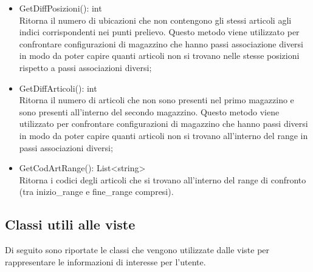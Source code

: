 \begin{itemize}
    \item GetDiffPosizioni(): int \\
    Ritorna il numero di ubicazioni che non contengono gli stessi articoli agli indici corrispondenti nei punti prelievo.
    Questo metodo viene utilizzato per confrontare configurazioni di magazzino che hanno passi associazione diversi in modo da poter capire quanti articoli non si trovano nelle stesse posizioni
    rispetto a passi associazioni diversi;\\
    \item GetDiffArticoli(): int \\
    Ritorna il numero di articoli che non sono presenti nel primo magazzino e sono presenti all'interno del secondo magazzino.
    Questo metodo viene utilizzato per confrontare configurazioni di magazzino che hanno passi diversi in modo da poter capire quanti articoli non si trovano all'interno del range in passi associazioni diversi;\\
    \item GetCodArtRange(): List<string> \\
    Ritorna i codici degli articoli che si trovano all'interno del range di confronto (tra inizio\_range e fine\_range compresi).\\
\end{itemize} 
\subsection{Classi utili alle viste}
Di seguito sono riportate le classi che vengono utilizzate dalle viste per rappresentare le informazioni di interesse per l'utente.
\\\\
 
